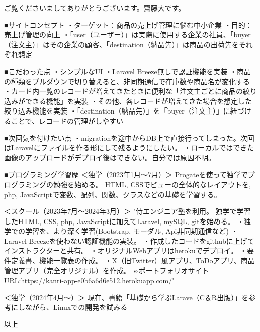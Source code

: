 ご覧くださいましてありがとうございます。齋藤大です。


■サイトコンセプト
・ターゲット：商品の売上げ管理に悩む中小企業
・目的：売上げ管理の向上
・「user（ユーザー）」は実際に使用する企業の社員、「buyer（注文主）」はその企業の顧客、「destination（納品先）」は商品の出荷先をそれぞれ想定

■こだわった点
・シンプルなUI
・Laravel Breeze無しで認証機能を実装
・商品の種類をプルダウンで切り替えると、非同期通信で在庫数や商品名が変化する
・カード内一覧のレコードが増えてきたときに便利な「注文主ごとに商品の絞り込みができる機能」を実装
・その他、各レコードが増えてきた場合を想定した絞り込み機能を実装
・「destination（納品先）」を「buyer（注文主）」に紐づけることで、レコードの管理がしやすい

■次回気を付けたい点
・migrationを途中からDB上で直接行ってしまった。次回はLaravelにファイルを作る形にして残るようにしたい。
・ローカルではできた画像のアップロードがデプロイ後はできない。自分では原因不明。


■プログラミング学習歴	
＜独学（2023年1月～7月）＞	
Progateを使って独学でプログラミングの勉強を始める。
HTML, CSSでビューの全体的なレイアウトを, php, JavaScriptで変数、配列、関数、クラスなどの基礎を学習する。
		
＜スクール（2023年7月～2024年3月）＞		
"侍エンジニア塾を利用。
独学で学習したHTML, CSS, php, JavaScriptに加えてLaravel, mySQL, gitを始める。
・独学での学習を、より深く学習(Bootstrap, モーダル, Api非同期通信など)
・Laravel Breezeを使わない認証機能の実装。
・作成したコードをgithubに上げてインストラクターと共有。
・オリジナルWebアプリはherokuでデプロイ。
・要件定義書、機能一覧表の作成。
・X（旧Twitter）風アプリ、ToDoアプリ、商品管理アプリ（完全オリジナル）を作成。
※ポートフォリオサイトURL:https://kanri-app-e0b6a6d6e512.herokuapp.com/"		

＜独学（2024年4月～）＞		
現在、書籍「基礎から学ぶLarave（C＆R出版）」を参考にしながら、Linuxでの開発を試みる

以上